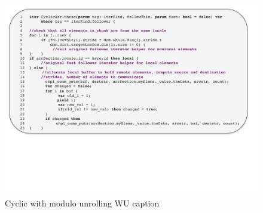 \begin{figure}
	\begin{center}
	\includegraphics[scale=0.40]{./Figures/cyclic_muwu_follower}
	\caption{Cyclic with modulo unrolling WU caption}
	\label{cyclic_muwu_follower}
	\end{center}
\end{figure}

